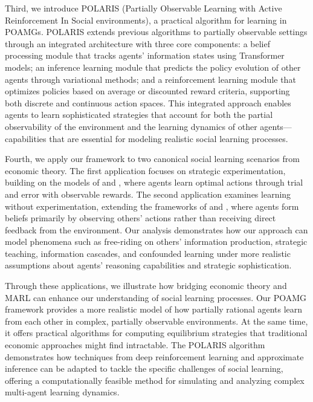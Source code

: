 \documentclass[a4paper,12pt]{report}
\begin{document}
Third, we introduce POLARIS (Partially Observable Learning with Active Reinforcement In Social environments), a practical algorithm for learning in POAMGs. POLARIS extends previous algorithms to partially observable settings through an integrated architecture with three core components: a belief processing module that tracks agents' information states using Transformer models; an inference learning module that predicts the policy evolution of other agents through variational methods; and a reinforcement learning module that optimizes policies based on average or discounted reward criteria, supporting both discrete and continuous action spaces. This integrated approach enables agents to learn sophisticated strategies that account for both the partial observability of the environment and the learning dynamics of other agents—capabilities that are essential for modeling realistic social learning processes.

Fourth, we apply our framework to two canonical social learning scenarios from economic theory. The first application focuses on strategic experimentation, building on the models of \citet{bolton1999strategic} and \citet{keller2020undiscounted}, where agents learn optimal actions through trial and error with observable rewards. The second application examines learning without experimentation, extending the frameworks of \citet{huang2024learning} and \citet{brandl2024}, where agents form beliefs primarily by observing others' actions rather than receiving direct feedback from the environment. Our analysis demonstrates how our approach can model phenomena such as free-riding on others' information production, strategic teaching, information cascades, and confounded learning under more realistic assumptions about agents' reasoning capabilities and strategic sophistication.

Through these applications, we illustrate how bridging economic theory and MARL can enhance our understanding of social learning processes. Our POAMG framework provides a more realistic model of how partially rational agents learn from each other in complex, partially observable environments. At the same time, it offers practical algorithms for computing equilibrium strategies that traditional economic approaches might find intractable. The POLARIS algorithm demonstrates how techniques from deep reinforcement learning and approximate inference can be adapted to tackle the specific challenges of social learning, offering a computationally feasible method for simulating and analyzing complex multi-agent learning dynamics.
\end{document}
